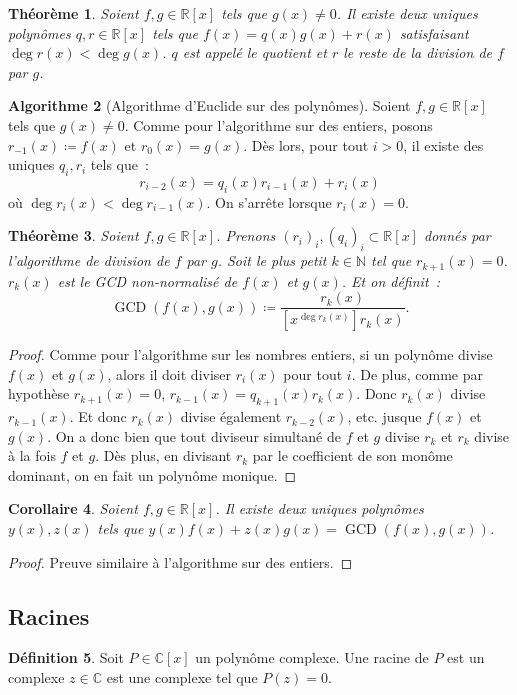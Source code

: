 \documentclass{article}
\DeclareMathOperator{\GCD}{GCD}
\newcommand{\N}{\mathbb N}
\newcommand{\R}{\mathbb R}
\newcommand{\C}{\mathbb C}
\newtheorem{thm}{Théorème}[section]
\newtheorem{cor}[thm]{Corollaire}
\theoremstyle{definition}
\newtheorem{alg}[thm]{Algorithme}
\newtheorem{déf}[thm]{Définition}
\theoremstyle{remark}
\begin{document}
		\begin{thm} Soient $f, g \in \R[x]$ tels que $g(x) \neq 0$. Il existe deux uniques polynômes $q, r \in \R[x]$ tels que $f(x) = q(x)g(x) + r(x)$ satisfaisant
		$\deg r(x) < \deg g(x)$. $q$ est appelé le quotient et $r$ le reste de la division de $f$ par $g$. \end{thm}

		\begin{alg}[Algorithme d'Euclide sur des polynômes] Soient $f, g \in \R[x]$ tels que $g(x) \neq 0$. Comme pour l'algorithme sur des entiers, posons
		$r_{-1}(x) \coloneqq f(x)$ et $r_0(x) = g(x)$. Dès lors, pour tout $i > 0$, il existe des uniques $q_i, r_i$ tels que~:\[r_{i-2}(x) = q_i(x)r_{i-1}(x) + r_i(x)\]
		où $\deg r_i(x) < \deg r_{i-1}(x)$. On s'arrête lorsque $r_i(x) = 0$. \end{alg}

		\begin{thm} Soient $f, g \in \R[x]$. Prenons $(r_i)_i, (q_i)_i \subset \R[x]$ donnés par l'algorithme de division de $f$ par $g$. Soit le plus petit $k \in \N$
		tel que $r_{k+1}(x) = 0$. $r_k(x)$ est le GCD non-normalisé de $f(x)$ et $g(x)$. Et on définit~:
		\[\GCD(f(x), g(x)) \coloneqq \frac {r_k(x)}{[x^{\deg r_k(x)}]r_k(x)}.\] \end{thm}

		\begin{proof} Comme pour l'algorithme sur les nombres entiers, si un polynôme divise $f(x)$ et $g(x)$, alors il doit diviser $r_i(x)$ pour tout $i$. De plus,
		comme par hypothèse $r_{k+1}(x) = 0$, $r_{k-1}(x) = q_{k+1}(x)r_k(x)$. Donc $r_k(x)$ divise $r_{k-1}(x)$. Et donc $r_k(x)$ divise également $r_{k-2}(x)$, etc.
		jusque $f(x)$ et $g(x)$. On a donc bien que tout diviseur simultané de $f$ et $g$ divise $r_k$ et $r_k$ divise à la fois $f$ et $g$. Dès plus, en divisant
		$r_k$ par le coefficient de son monôme dominant, on en fait un polynôme monique. \end{proof}

		\begin{cor} Soient $f, g \in \R[x]$. Il existe deux uniques polynômes $y(x), z(x)$ tels que $y(x)f(x)+z(x)g(x) = \GCD(f(x), g(x))$. \end{cor}

		\begin{proof} Preuve similaire à l'algorithme sur des entiers. \end{proof}

	\subsection{Racines}
		\begin{déf} Soit $P \in \C[x]$ un polynôme complexe. Une racine de $P$ est un complexe $z \in \C$ est une complexe tel que $P(z) = 0$. \end{déf}
\end{document}
